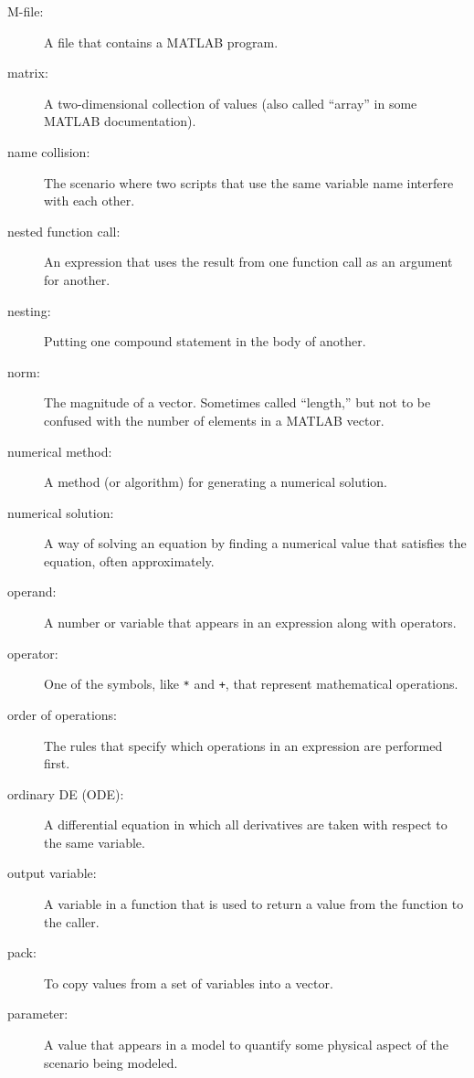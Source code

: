 \begin{description}
\item[M-file:] A file that contains a MATLAB program.

\item[matrix:] A two-dimensional collection of values (also called
``array'' in some MATLAB documentation).

\item[name collision:] The scenario where two scripts that use the
same variable name interfere with each other.

\item[nested function call:] An expression that uses the result from
one function call as an argument for another.

\item[nesting:] Putting one compound statement in the body of another.

\item[norm:] The magnitude of a vector.  Sometimes called ``length,''
but not to be confused with the number of elements in a MATLAB
vector.

\item[numerical method:] A method (or algorithm) for generating
a numerical solution.

\item[numerical solution:] A way of solving an equation by finding
a numerical value that satisfies the equation, often approximately.

\item[operand:] A number or variable that appears in an expression along
with operators.

\item[operator:] One of the symbols, like \lstinline{*} and \lstinline{+}, that
represent mathematical operations.

\item[order of operations:] The rules that specify which operations
in an expression are performed first.

\item[ordinary DE (ODE):] A differential equation in which all derivatives are taken with
respect to the same variable.

\item[output variable:] A variable in a function that is used to
return a value from the function to the caller.

\item[pack:] To copy values from a set of variables into a vector.

\item[parameter:] A value that appears in a model to quantify some
physical aspect of the scenario being modeled.


\end{description}
